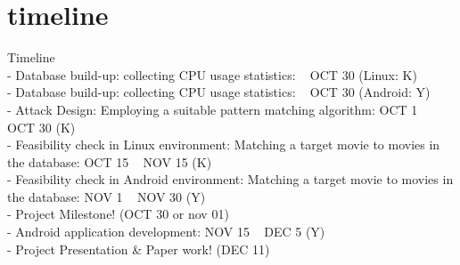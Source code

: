 \section{timeline}
\label{sec:timeline}
Timeline\\
- Database build-up: collecting CPU usage statistics: ~ OCT 30 (Linux: K) \\
- Database build-up: collecting CPU usage statistics: ~ OCT 30 (Android: Y) \\
- Attack Design: Employing a suitable pattern matching algorithm: OCT 1  ~ OCT 30 (K)\\
- Feasibility check in Linux environment: Matching a target movie to movies in the database: OCT 15 ~ NOV 15 (K)\\
- Feasibility check in Android environment: Matching a target movie to movies in the database: NOV 1 ~ NOV 30 (Y)\\
- Project Milestone!  (OCT 30 or nov 01)\\
- Android application development: NOV 15 ~ DEC 5 (Y)\\
- Project Presentation \& Paper work! (DEC 11)
